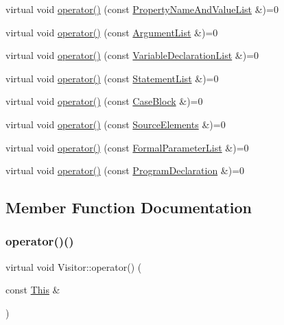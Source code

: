 \begin{DoxyCompactItemize}
\item 
virtual void \hyperlink{struct_visitor_a91666efb64ff75272e244610bea83717}{operator()} (const \hyperlink{struct_property_name_and_value_list}{Property\+Name\+And\+Value\+List} \&)=0
\item 
virtual void \hyperlink{struct_visitor_afe0ebb45873b49711e28f543e1be18ab}{operator()} (const \hyperlink{struct_argument_list}{Argument\+List} \&)=0
\item 
virtual void \hyperlink{struct_visitor_af12d0fa756687bf6e54263bf65832663}{operator()} (const \hyperlink{struct_variable_declaration_list}{Variable\+Declaration\+List} \&)=0
\item 
virtual void \hyperlink{struct_visitor_a36ea2fb9b8225f7b4c04c3d546c4608a}{operator()} (const \hyperlink{struct_statement_list}{Statement\+List} \&)=0
\item 
virtual void \hyperlink{struct_visitor_a6042d08a4d52ec6d3cd76251c88c5202}{operator()} (const \hyperlink{struct_case_block}{Case\+Block} \&)=0
\item 
virtual void \hyperlink{struct_visitor_ad9a1464cbbd0ab4e528ac4d22c056647}{operator()} (const \hyperlink{struct_source_elements}{Source\+Elements} \&)=0
\item 
virtual void \hyperlink{struct_visitor_a1481a506dd79cc99d06ea9ebd2ac08ad}{operator()} (const \hyperlink{struct_formal_parameter_list}{Formal\+Parameter\+List} \&)=0
\item 
virtual void \hyperlink{struct_visitor_ab6afd14c23c1fa6f01d24e2593ac91bf}{operator()} (const \hyperlink{struct_program_declaration}{Program\+Declaration} \&)=0
\end{DoxyCompactItemize}


\subsection{Member Function Documentation}
\mbox{\label{struct_visitor_a7a043c9da4e7f8233db48afb82dbc7bc}} 
\subsubsection{\texorpdfstring{operator()()}{operator()()}\hspace{0.1cm}{\footnotesize\ttfamily [1/60]}}
{\footnotesize\ttfamily virtual void Visitor\+::operator() (\begin{DoxyParamCaption}\item[{const \hyperlink{struct_this}{This} \&}]{ }\end{DoxyParamCaption})\hspace{0.3cm}{\ttfamily [pure virtual]}}



